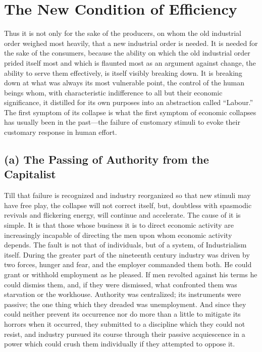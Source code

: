 \documentclass{book}
\begin{document}
\chapter{The New Condition of Efficiency}
\label{chapter-8}
Thus it is not only for the sake of the producers, on whom the old industrial order weighed most heavily, that a new industrial order is needed. It is needed for the sake of the consumers, because the ability on which the old industrial order prided itself most and which is flaunted most as an argument against change, the ability to serve them effectively, is itself visibly breaking down. It is breaking down at what was always its most vulnerable point, the control of the human beings whom, with characteristic indifference to all but their economic significance, it distilled for its own purposes into an abstraction called “Labour.” The first symptom of its collapse is what the first symptom of economic collapses has usually been in the past—the failure of customary stimuli to evoke their customary response in human effort.

\section{(a) The Passing of Authority from the Capitalist}
Till that failure is recognized and industry reorganized so that new stimuli may have free play, the collapse will not correct itself, but, doubtless with spasmodic revivals and flickering energy, will continue and accelerate. The cause of it is simple. It is that those whose business it is to direct economic activity are increasingly incapable of directing the men upon whom economic activity depends. The fault is not that of individuals, but of a system, of Industrialism itself. During the greater part of the nineteenth century industry was driven by two forces, hunger and fear, and the employer commanded them both. He could grant or withhold employment as he pleased. If men revolted against his terms he could dismiss them, and, if they were dismissed, what confronted them was starvation or the workhouse. Authority was centralized; its instruments were passive; the one thing which they dreaded was unemployment. And since they could neither prevent its occurrence nor do more than a little to mitigate its horrors when it occurred, they submitted to a discipline which they could not resist, and industry pursued its course through their passive acquiescence in a power which could crush them individually if they attempted to oppose it.
\end{document}

